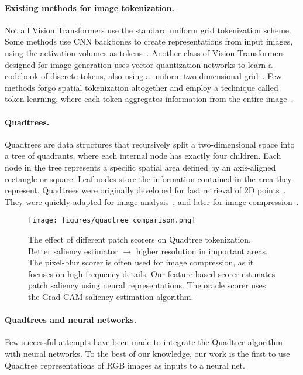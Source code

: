 \paragraph{Existing methods for image tokenization.} Not all Vision Transformers use the standard uniform grid tokenization scheme. Some methods use CNN backbones to create representations from input images, using the activation volumes as tokens~\cite{Xiao2021EarlyCH,Graham2021LeViTAV}. Another class of Vision Transformers designed for image generation uses vector-quantization networks to learn a codebook of discrete tokens, also using a uniform two-dimensional grid~\cite{Esser2020TamingTF,Ramesh2021ZeroShotTG}. Few methods forgo spatial tokenization altogether and employ a technique called token learning, where each token aggregates information from the entire image~\cite{Ryoo2021TokenLearnerAS}.

\paragraph{Quadtrees.} Quadtrees are data structures that recursively split a two-dimensional space into a tree of quadrants, where each internal node has exactly four children. Each node in the tree represents a specific spatial area defined by an axis-aligned rectangle or square. Leaf nodes store the information contained in the area they represent. Quadtrees were originally developed for fast retrieval of 2D points~\cite{Finkel1974QuadTA}. They were quickly adapted for image analysis~\cite{Hunter1979OperationsOI}, and later for image compression~\cite{Markas1992QuadTS}.


\begin{figure*}[t!]
  \vspace*{-5pt}
  \centering
  \texttt{[image: figures/quadtree\_comparison.png]}
  \caption{The effect of different patch scorers on Quadtree tokenization. Better saliency estimator $\rightarrow$ higher resolution in important areas. The pixel-blur scorer is often used for image compression, as it focuses on high-frequency details. Our feature-based scorer estimates patch saliency using neural representations. The oracle scorer uses the Grad-CAM saliency estimation algorithm.}
  \label{figure:quadtree_comparison}
\end{figure*}


\paragraph{Quadtrees and neural networks.} Few successful attempts have been made to integrate the Quadtree algorithm with neural networks. To the best of our knowledge, our work is the first to use Quadtree representations of RGB images as inputs to a neural net.

